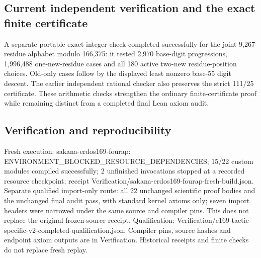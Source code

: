 \documentclass[11pt,a4paper]{article}
\begin{document}
\subsection{Current independent verification and the exact finite certificate}
A separate portable exact-integer check completed successfully for the joint 9,267-residue alphabet modulo 166,375: it tested 2,970 base-digit progressions, 1,996,488 one-new-residue cases and all 180 active two-new residue-position choices. Old-only cases follow by the displayed least nonzero base-55 digit descent. The earlier independent rational checker also preserves the strict 111/25 certificate. These arithmetic checks strengthen the ordinary finite-certificate proof while remaining distinct from a completed final Lean axiom audit.

\subsection{Verification and reproducibility}
Fresh execution: sakana-erdos169-fourap: ENVIRONMENT\_BLOCKED\_RESOURCE\_DEPENDENCIES; 15/22 custom modules compiled successfully; 2 unfinished invocations stopped at a recorded resource checkpoint; receipt Verification/sakana-erdos169-fourap-fresh-build.json. Separate qualified import-only route: all 22 unchanged scientific proof bodies and the unchanged final audit pass, with standard kernel axioms only; seven import headers were narrowed under the same source and compiler pins. This does not replace the original frozen-source receipt. Qualification: Verification/e169-tactic-specific-v2-completed-qualification.json. Compiler pins, source hashes and endpoint axiom outputs are in Verification. Historical receipts and finite checks do not replace fresh replay.
\end{document}

